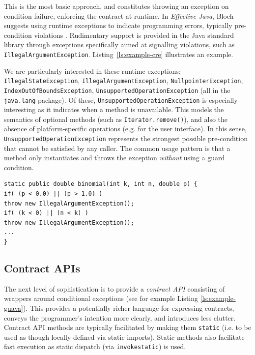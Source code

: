 \documentclass[a4paper,UKenglish]{lipics-v2016}
\begin{document}
This is the most basic approach, and constitutes throwing an exception on condition failure, enforcing the contract at runtime.  In {\em Effective Java}, Bloch suggests using runtime exceptions to indicate programming errors, typically pre-condition violations \cite[item 58]{bloch2008effective}.  Rudimentary support is provided in the Java standard library through exceptions specifically aimed at signalling violations, such as \texttt{Illegal\-Argument\-Exception}.  Listing~\ref{ls:example-cre} illustrates an example. 

We are particularly interested in these runtime exceptions: 
\texttt{Illegal\-State\-Exception}, \texttt{Illegal\-Argument\-Exception}, \texttt{Null\-pointer\-Exception}, \texttt{Index\-Out\-Of\-Bounds\-Ex\-cep\-tion}, \texttt{Un\-sup\-ported\-Operation\-Excep\-tion} (all in the \texttt{java.lang} package).  Of these, \texttt{Un\-sup\-ported\-Operation\-Excep\-tion} is especially interesting as it indicates when a method is unavailable.  This models the semantics of optional methods (such as \texttt{Iterator.remove()}), and also the absence of platform-specific operations (e.g. for the user interface).  In this sense, \texttt{UnsupportedOperationException} represents the strongest possible pre-condition that cannot be satisfied by any caller. The common usage pattern is that a method only instantiates and throws the exception \textit{without} using a guard condition. 

\begin{lstlisting}[caption=Use of conditional runtime exceptions in pre-condition checks in \texttt{cern.jet.stat.Probability} (in \textit{colt 1.2.0}),frame=tlrb,columns=flexible,label=ls:example-cre]
static public double binomial(int k, int n, double p) {
if( (p < 0.0) || (p > 1.0) ) 
throw new IllegalArgumentException();   
if( (k < 0) || (n < k) ) 
throw new IllegalArgumentException();
...
}
\end{lstlisting}


\subsection{Contract APIs}
\label{ssec:contracts:api}

The next level of sophistication is to provide a {\em contract API} consisting of wrappers around conditional exceptions (see for example Listing \ref{ls:example-guava}).  This provides a potentially richer language for expressing contracts, conveys the programmer's intention more clearly, and introduces less clutter.  Contract API methods are typically facilitated by making them \texttt{static} (i.e. to be used as though locally defined via static imports).  Static methods also facilitate fast execution as static dispatch (via \texttt{invokestatic}) is used.
\end{document}
